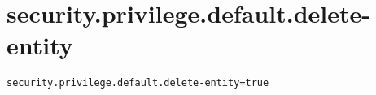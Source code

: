 \section{security.privilege.default.delete-entity}
\label{configuration:SecurityPrivilegeDefaultDeleteEntity}
\ClearAPI
\TODO
{}
\begin{lstlisting}[style=Props,caption={Usage example for \textit{security.privilege.default.delete-entity}}]
security.privilege.default.delete-entity=true
\end{lstlisting}